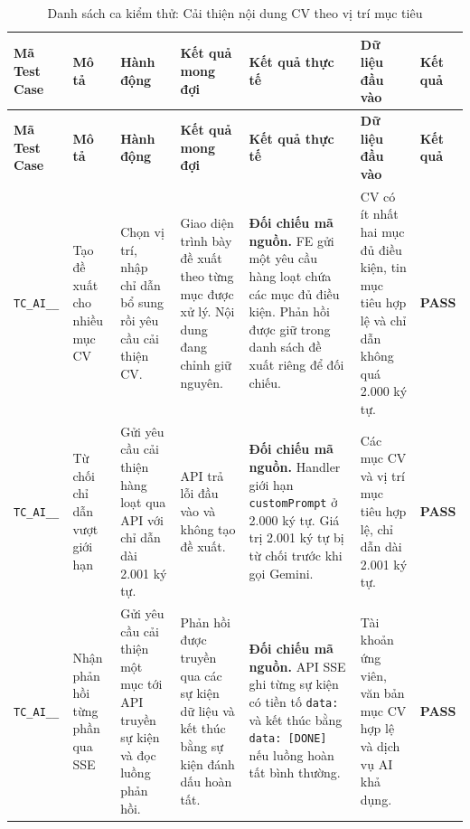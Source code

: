 \begin{landscape}
{
\fontsize{9.5}{11.5}\selectfont
\setlength{\tabcolsep}{3pt}
\renewcommand{\arraystretch}{1.2}
\begin{longtable}{|>{\raggedright\arraybackslash}p{2.1cm}|>{\raggedright\arraybackslash}p{2.8cm}|>{\raggedright\arraybackslash}p{3.8cm}|>{\raggedright\arraybackslash}p{4.0cm}|>{\raggedright\arraybackslash}p{5.0cm}|>{\raggedright\arraybackslash}p{3.2cm}|>{\centering\arraybackslash}p{1.3cm}|}
    \caption{Danh sách ca kiểm thử: Cải thiện nội dung CV theo vị trí mục tiêu} \label{tab:ts-ai-03} \\
    \hline
    \textbf{Mã Test Case} & \textbf{Mô tả} & \textbf{Hành động} & \textbf{Kết quả mong đợi} & \textbf{Kết quả thực tế} & \textbf{Dữ liệu đầu vào} & \textbf{Kết quả} \\
    \hline
    \endfirsthead
    \hline
    \textbf{Mã Test Case} & \textbf{Mô tả} & \textbf{Hành động} & \textbf{Kết quả mong đợi} & \textbf{Kết quả thực tế} & \textbf{Dữ liệu đầu vào} & \textbf{Kết quả} \\
    \hline
    \endhead
    \hline
    \endfoot
    \hline
    \endlastfoot
    \texttt{TC\_\allowbreak AI\_\allowbreak 03\_\allowbreak 01} & Tạo đề xuất cho nhiều mục CV & Chọn vị trí, nhập chỉ dẫn bổ sung rồi yêu cầu cải thiện CV. & Giao diện trình bày đề xuất theo từng mục được xử lý. Nội dung đang chỉnh giữ nguyên. & \textbf{Đối chiếu mã nguồn.} FE gửi một yêu cầu hàng loạt chứa các mục đủ điều kiện. Phản hồi được giữ trong danh sách đề xuất riêng để đối chiếu. & CV có ít nhất hai mục đủ điều kiện, tin mục tiêu hợp lệ và chỉ dẫn không quá 2.000 ký tự. & \textbf{PASS} \\
    \hline
    \texttt{TC\_\allowbreak AI\_\allowbreak 03\_\allowbreak 02} & Từ chối chỉ dẫn vượt giới hạn & Gửi yêu cầu cải thiện hàng loạt qua API với chỉ dẫn dài 2.001 ký tự. & API trả lỗi đầu vào và không tạo đề xuất. & \textbf{Đối chiếu mã nguồn.} Handler giới hạn \texttt{customPrompt} ở 2.000 ký tự. Giá trị 2.001 ký tự bị từ chối trước khi gọi Gemini. & Các mục CV và vị trí mục tiêu hợp lệ, chỉ dẫn dài 2.001 ký tự. & \textbf{PASS} \\
    \hline
    \texttt{TC\_\allowbreak AI\_\allowbreak 03\_\allowbreak 03} & Nhận phản hồi từng phần qua SSE & Gửi yêu cầu cải thiện một mục tới API truyền sự kiện và đọc luồng phản hồi. & Phản hồi được truyền qua các sự kiện dữ liệu và kết thúc bằng sự kiện đánh dấu hoàn tất. & \textbf{Đối chiếu mã nguồn.} API SSE ghi từng sự kiện có tiền tố \texttt{data:} và kết thúc bằng \texttt{data: [DONE]} nếu luồng hoàn tất bình thường. & Tài khoản ứng viên, văn bản mục CV hợp lệ và dịch vụ AI khả dụng. & \textbf{PASS} \\
    \hline
\end{longtable}
}


\end{landscape}
